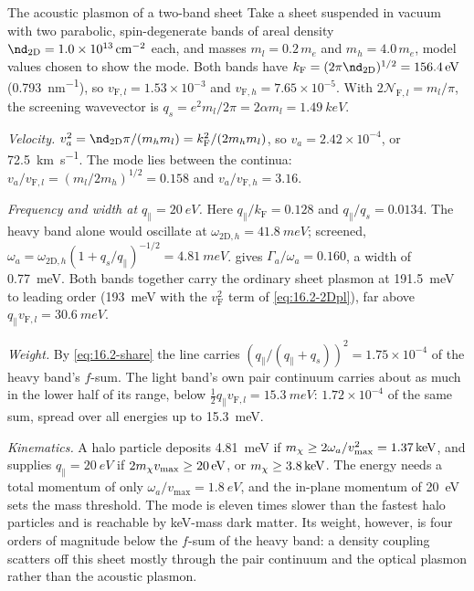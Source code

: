 \begin{workedexample}{The acoustic plasmon of a two-band sheet}\label{we:16-demon}
Take a sheet suspended in vacuum with two parabolic, spin-degenerate bands of areal density $\nd_{\mathrm{2D}} = \SI{1.0e13}{cm^{-2}}$ each, and masses $m_l = 0.2\,m_e$ and $m_h = 4.0\,m_e$, model values chosen to show the mode. Both bands have $k_{\mathrm{F}} = (2\pi\nd_{\mathrm{2D}})^{1/2} = \SI{156.4}{eV}$ (\SI{0.793}{nm^{-1}}), so $v_{\mathrm{F},l} = 1.53\times10^{-3}$ and $v_{\mathrm{F},h} = 7.65\times10^{-5}$. With $2\mathcal{N}_{\mathrm{F},l} = m_l/\pi$, the screening wavevector is $q_s = e^2m_l/2\pi = 2\alpha m_l = \SI{1.49}{keV}$.

\emph{Velocity.} $v_a^2 = \nd_{\mathrm{2D}}\pi/(m_hm_l) = k_{\mathrm{F}}^2/(2m_hm_l)$, so $v_a = 2.42\times10^{-4}$, or \SI{72.5}{km.s^{-1}}. The mode lies between the continua: $v_a/v_{\mathrm{F},l} = (m_l/2m_h)^{1/2} = 0.158$ and $v_a/v_{\mathrm{F},h} = 3.16$.

\emph{Frequency and width at $q_\parallel = \SI{20}{eV}$.} Here $q_\parallel/k_{\mathrm{F}} = 0.128$ and $q_\parallel/q_s = 0.0134$. The heavy band alone would oscillate at $\omega_{\mathrm{2D},h} = \SI{41.8}{meV}$; screened, $\omega_a = \omega_{\mathrm{2D},h}(1 + q_s/q_\parallel)^{-1/2} = \SI{4.81}{meV}$.  gives $\varGamma_a/\omega_a = 0.160$, a width of \SI{0.77}{meV}. Both bands together carry the ordinary sheet plasmon at \SI{191.5}{meV} to leading order (\SI{193}{meV} with the $v_{\mathrm{F}}^2$ term of \cref{eq:16.2-2Dpl}), far above $q_\parallel v_{\mathrm{F},l} = \SI{30.6}{meV}$.

\emph{Weight.} By \cref{eq:16.2-share} the line carries $(q_\parallel/(q_\parallel + q_s))^2 = 1.75\times10^{-4}$ of the heavy band's $f$-sum. The light band's own pair continuum carries about as much in the lower half of its range, below $\tfrac12q_\parallel v_{\mathrm{F},l} = \SI{15.3}{meV}$: $1.72\times10^{-4}$ of the same sum, spread over all energies up to \SI{15.3}{meV}.

\emph{Kinematics.} A halo particle deposits \SI{4.81}{meV} if $m_{\chi} \ge 2\omega_a/v_{\mathrm{max}}^2 = \SI{1.37}{keV}$, and supplies $q_\parallel = \SI{20}{eV}$ if $2m_{\chi} v_{\mathrm{max}} \ge \SI{20}{eV}$, or $m_{\chi} \ge \SI{3.8}{keV}$. The energy needs a total momentum of only $\omega_a/v_{\mathrm{max}} = \SI{1.8}{eV}$, and the in-plane momentum of \SI{20}{eV} sets the mass threshold. The mode is eleven times slower than the fastest halo particles and is reachable by keV-mass dark matter. Its weight, however, is four orders of magnitude below the $f$-sum of the heavy band: a density coupling scatters off this sheet mostly through the pair continuum and the optical plasmon rather than the acoustic plasmon.
\end{workedexample}

